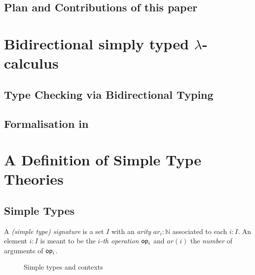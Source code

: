 \documentclass[acmsmall]{acmart}
\begin{document}
\subsection{Plan and Contributions of this paper}

\section{Bidirectional simply typed \texorpdfstring{$\lambda$}{lambda}-calculus}
\subsection{Type Checking via Bidirectional Typing}
\subsection{Formalisation in \Agda}

\section{A Definition of Simple Type Theories}
\subsection{Simple Types}
\begin{definition}
  A \emph{(simple type) signature} is a set $I$ with an \emph{arity} $\mathit{ar}_i : \mathbb{N}$ associated to each $i : I$.
  An element $i : I$ is meant to be the \emph{$i$-th operation} $\mathsf{op}_{i}$ and $\mathit{ar}(i)$ the \emph{number} of arguments of $\mathsf{op}_{i}$.
\end{definition}
\begin{figure}
  \begin{subfigure}{.5\textwidth}
  \end{subfigure}
  \begin{subfigure}{.4\textwidth}
  \end{subfigure}
  \caption{Simple types and contexts}
\end{figure}
\end{document}
